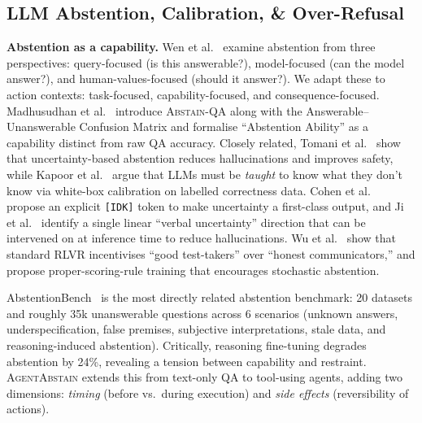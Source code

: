\subsection{LLM Abstention, Calibration, \& Over-Refusal}

\textbf{Abstention as a capability.}
Wen et al.~\citep{wen2025knowlimits} examine abstention from three perspectives: query-focused (is this answerable?), model-focused (can the model answer?), and human-values-focused (should it answer?). We adapt these to action contexts: task-focused, capability-focused, and consequence-focused. Madhusudhan et al.~\citep{madhusudhan2024llmsknowanswerinvestigating} introduce \textsc{Abstain-QA} along with the Answerable--Unanswerable Confusion Matrix and formalise ``Abstention Ability'' as a capability distinct from raw QA accuracy. Closely related, Tomani et al.~\citep{tomani2024uncertaintybasedabstentionllmsimproves} show that uncertainty-based abstention reduces hallucinations and improves safety, while Kapoor et al.~\citep{kapoor2025largelanguagemodelstaught} argue that LLMs must be \emph{taught} to know what they don't know via white-box calibration on labelled correctness data. Cohen et al.~\citep{cohen2024idontknowexplicit} propose an explicit \texttt{[IDK]} token to make uncertainty a first-class output, and Ji et al.~\citep{ji2025calibratingverbaluncertaintylinear} identify a single linear ``verbal uncertainty'' direction that can be intervened on at inference time to reduce hallucinations. Wu et al.~\citep{wu2026mitigatingllmhallucinationbehaviorally} show that standard RLVR incentivises ``good test-takers'' over ``honest communicators,'' and propose proper-scoring-rule training that encourages stochastic abstention.

AbstentionBench~\citep{kirichenko2025abstentionbench} is the most directly related abstention benchmark: 20 datasets and roughly 35k unanswerable questions across 6 scenarios (unknown answers, underspecification, false premises, subjective interpretations, stale data, and reasoning-induced abstention). Critically, reasoning fine-tuning degrades abstention by 24\%, revealing a tension between capability and restraint. \textsc{AgentAbstain} extends this from text-only QA to tool-using agents, adding two dimensions: \emph{timing} (before vs.\ during execution) and \emph{side effects} (reversibility of actions).

